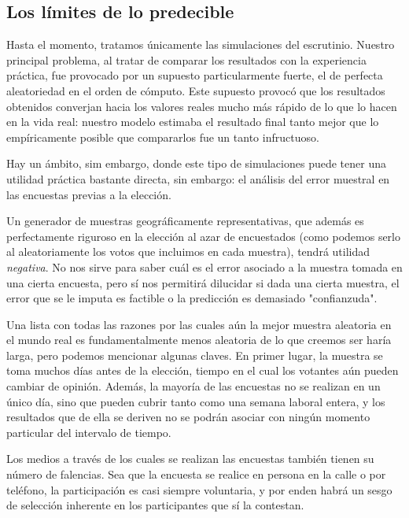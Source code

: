 \documentclass[12pt, a4paper]{article}
\begin{document}
\subsection{Los l\'imites de lo predecible}

Hasta el momento, tratamos \'unicamente las simulaciones del escrutinio. Nuestro principal problema, al tratar de comparar los resultados con la experiencia pr\'actica, fue provocado por un supuesto particularmente fuerte, el de perfecta aleatoriedad en el orden de c\'omputo. Este supuesto provoc\'o que los resultados obtenidos converjan hacia los valores reales mucho m\'as r\'apido de lo que lo hacen en la vida real: nuestro modelo estimaba el resultado final tanto mejor que lo emp\'iricamente posible que compararlos fue un tanto infructuoso.

Hay un \'ambito, sim embargo, donde este tipo de simulaciones puede tener una utilidad pr\'actica bastante directa, sin embargo: el an\'alisis del error muestral en las encuestas previas a la elecci\'on.

Un generador de muestras geogr\'aficamente representativas, que adem\'as es perfectamente riguroso en la elecci\'on al azar de encuestados (como podemos serlo al aleatoriamente los votos que incluimos en cada muestra), tendr\'a utilidad \emph{negativa}. No nos sirve para saber cu\'al es el error asociado a la muestra tomada en una cierta encuesta, pero s\'i nos permitir\'a dilucidar si dada una cierta muestra, el error que se le imputa es factible o la predicci\'on es demasiado "confianzuda".

Una lista con todas las razones por las cuales a\'un la mejor muestra aleatoria en el mundo real es fundamentalmente menos aleatoria de lo que creemos ser har\'ia larga, pero podemos mencionar algunas claves.
En primer lugar, la muestra se toma muchos d\'ias antes de la elecci\'on, tiempo en el cual los votantes a\'un pueden cambiar de opini\'on. Adem\'as, la mayor\'ia de las encuestas no se realizan en un \'unico d\'ia, sino que pueden cubrir tanto como una semana laboral entera, y los resultados que de ella se deriven no se podr\'an asociar con ning\'un momento particular del intervalo de tiempo.

Los medios a trav\'es de los cuales se realizan las encuestas tambi\'en tienen su n\'umero de falencias. Sea que la encuesta se realice en persona en la calle o por tel\'efono, la participaci\'on es casi siempre voluntaria, y por enden habr\'a un sesgo de selecci\'on inherente en los participantes que s\'i la contestan.
\end{document}
